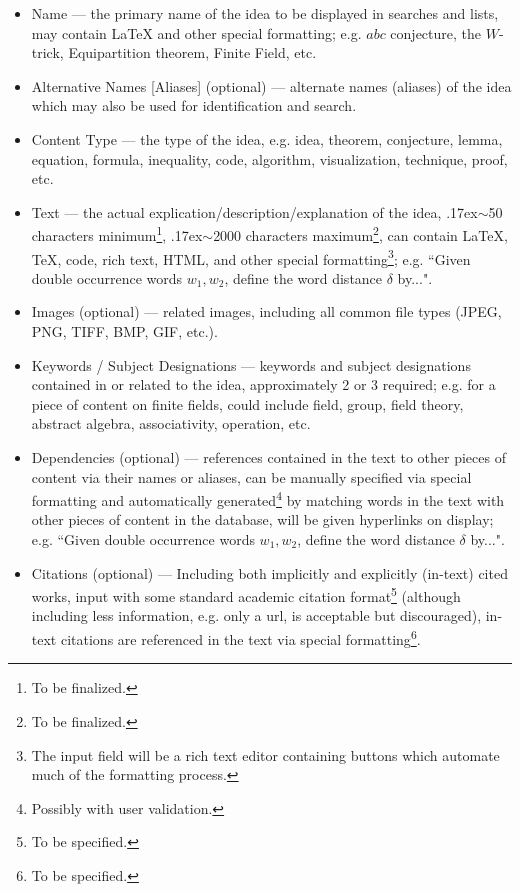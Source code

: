 \documentclass[12pt,letterpaper]{article}
\begin{document}
\begin{itemize}
\item Name --- the primary name of the idea to be displayed in searches and lists, may contain \LaTeX \textrm{ }and other special formatting; e.g. $abc$ conjecture, the $W$-trick, Equipartition theorem, Finite Field, etc.
\item Alternative Names [Aliases] (optional) --- alternate names (aliases) of the idea which may also be used for identification and search.
\item Content Type --- the type of the idea, e.g. idea, theorem, conjecture, lemma, equation, formula, inequality, code, algorithm, visualization, technique, proof, etc.
\item Text --- the actual explication/description/explanation of the idea, {\raise.17ex\hbox{$\scriptstyle\mathtt{\sim}$}}50 characters minimum\footnote{To be finalized.}, {\raise.17ex\hbox{$\scriptstyle\mathtt{\sim}$}}2000 characters maximum\footnote{To be finalized.}, can contain \LaTeX, \TeX, code, rich text, HTML, and other special formatting\footnote{The input field will be a rich text editor containing buttons which automate much of the formatting process.}; e.g. ``Given double occurrence words $w_{1}, w_{2}$, define the word distance $\delta$ by...".
\item Images (optional) --- related images, including all common file types (JPEG, PNG, TIFF, BMP, GIF, etc.).
\item Keywords / Subject Designations --- keywords and subject designations contained in or related to the idea, approximately 2 or 3 required; e.g. for a piece of content on finite fields, could include field, group, field theory, abstract algebra, associativity, operation, etc.
\item Dependencies (optional) --- references contained in the text to other pieces of content via their names or aliases, can be manually specified via special formatting and automatically generated\footnote{Possibly with user validation.} by matching words in the text  with other pieces of content in the database, will be given hyperlinks on display; e.g. ``Given {\color{blue} double occurrence words} $w_{1}, w_{2}$, define the word distance $\delta$ by...".
\item Citations (optional) --- Including both implicitly and explicitly (in-text) cited works, input with some standard academic citation format\footnote{To be specified.} (although including less information, e.g. only a url, is acceptable but discouraged), in-text citations are referenced in the text via special formatting\footnote{To be specified.}.
\end{itemize}
\end{document}
